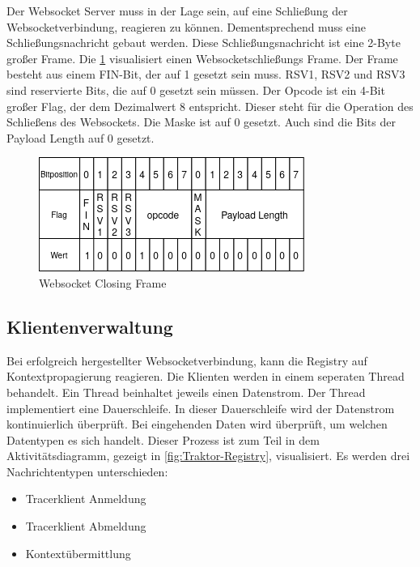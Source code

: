 Der Websocket Server muss in der Lage sein, auf eine Schließung der Websocketverbindung, reagieren zu können. Dementsprechend muss eine Schließungsnachricht gebaut werden.
Diese Schließungsnachricht ist eine 2-Byte großer Frame. Die \cref{fig:WebsocketClosingFrame} visualisiert einen Websocketschließungs Frame. Der Frame besteht aus einem FIN-Bit, der auf 1 gesetzt sein muss. RSV1, RSV2 und RSV3 sind reservierte Bits, die auf 0 gesetzt sein müssen. Der Opcode ist ein 4-Bit großer Flag, der dem Dezimalwert 8 entspricht. Dieser steht für die Operation des Schließens des Websockets. Die Maske ist auf 0 gesetzt. Auch sind die Bits der Payload Length auf 0 gesetzt. 

\begin{figure}[!ht]
	\centering
	\includegraphics[scale=0.8]{img/Implementierung/WebsocketClosingFrame.png}
	\caption[Websocket Closing Frame]{Websocket Closing Frame}
	\label{fig:WebsocketClosingFrame}
\end{figure}


\subsection{Klientenverwaltung}
\label{subsection:Klientenverwaltung}

Bei erfolgreich hergestellter Websocketverbindung, kann die Registry auf Kontextpropagierung reagieren. 
Die Klienten werden in einem seperaten Thread behandelt. 
Ein Thread beinhaltet jeweils einen Datenstrom. 
Der Thread implementiert eine Dauerschleife. 
In dieser Dauerschleife wird der Datenstrom kontinuierlich überprüft. 
Bei eingehenden Daten wird überprüft, um welchen Datentypen es sich handelt. 
Dieser Prozess ist zum Teil in dem Aktivitätsdiagramm, gezeigt in \cref{fig:Traktor-Registry}, visualisiert.
Es werden drei Nachrichtentypen unterschieden:
\begin{itemize}
	\item Tracerklient Anmeldung
	\item Tracerklient Abmeldung
	\item Kontextübermittlung
\end{itemize}

